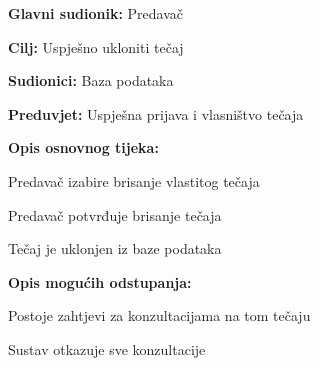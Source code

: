 			\noindent {}
			\begin{packed_item}
				
				\item \textbf{Glavni sudionik:} Predavač
				\item  \textbf{Cilj:} Uspješno ukloniti tečaj
				\item  \textbf{Sudionici:} Baza podataka
				\item  \textbf{Preduvjet:} Uspješna prijava i vlasništvo tečaja
				\item  \textbf{Opis osnovnog tijeka:}
				
				\item[] \begin{packed_enum}
					
					\item Predavač izabire brisanje vlastitog tečaja
					\item Predavač potvrđuje brisanje tečaja
					\item Tečaj je uklonjen iz baze podataka
					
				\end{packed_enum}
				\item  \textbf{Opis mogućih odstupanja:}
				
				\item[] \begin{packed_item}
					
					\item[1.a] Postoje zahtjevi za konzultacijama na tom tečaju
					\item[] \begin{packed_enum}
						
						\item Sustav otkazuje sve konzultacije
						
					\end{packed_enum}
					
				\end{packed_item}
				
			\end{packed_item}
				
